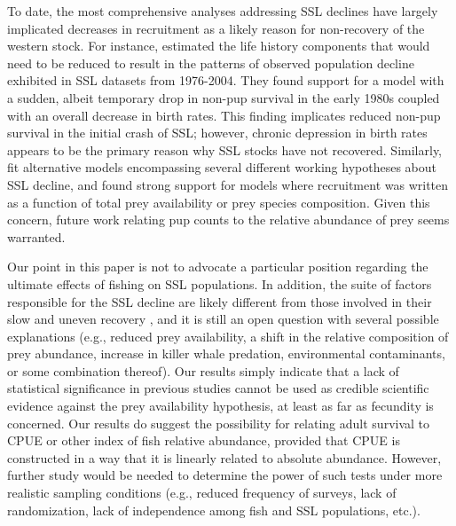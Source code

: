 \documentclass[11pt]{article}
\begin{document}
To date, the most comprehensive analyses addressing SSL declines have largely implicated decreases in recruitment as a likely reason for non-recovery of the western stock.  For instance, \citet{HolmesEtAl2007} estimated the life history components that would need to be reduced to result in
the patterns of observed population decline exhibited in SSL datasets from 1976-2004.  They found support for a model with a sudden, albeit temporary drop in non-pup survival in the early 1980s coupled with an overall decrease in birth rates.  This finding implicates reduced non-pup survival in the initial crash of SSL; however, chronic depression in birth rates appears to be the primary reason why SSL stocks have not recovered.  Similarly, \citet{Wolf:2008qf} fit alternative models encompassing several different working hypotheses about SSL decline, and found strong support for models where recruitment was written as a function of total prey availability or prey species composition.  Given this concern, future work relating pup counts to the relative abundance of prey seems warranted.

Our point in this paper is not to advocate a particular position regarding the ultimate effects of fishing on SSL populations.  In addition, the suite of factors responsible for the SSL decline are likely different from those involved in their slow and uneven recovery \citep{AtkinsonEtAl2008}, and it is still an open question with several possible explanations (e.g., reduced prey availability, a shift in the relative composition of prey abundance, increase in killer whale predation, environmental contaminants, or some combination thereof).  Our results simply indicate that a lack of statistical significance in previous studies cannot be used as credible scientific evidence against the prey availability hypothesis, at least as far as fecundity is concerned.  Our results do suggest the possibility for relating adult survival to CPUE or other index of fish relative abundance, provided that CPUE is constructed in a way that it is linearly related to absolute abundance.  However, further study would be needed to determine the power of such tests under more realistic sampling conditions (e.g., reduced frequency of surveys, lack of randomization, lack of independence among fish and SSL populations, etc.).
\end{document}
